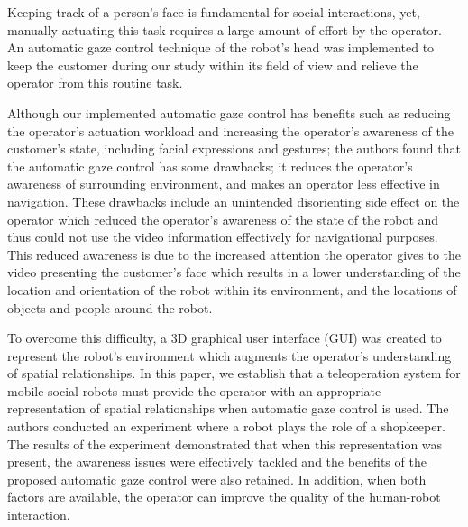 \documentclass[a4paper, 10pt, conference]{ieeeconf}     %
\begin{document}
Keeping track of a person's face is fundamental for social interactions, yet, manually actuating this task requires a large amount of effort by the operator.
An automatic gaze control technique of the robot's head was implemented to keep the customer during our study within its field of view and relieve the operator from this routine task.

Although our implemented automatic gaze control has benefits such as reducing the operator's actuation workload and increasing the operator's awareness of the customer's state, including facial expressions and gestures; the authors found that the automatic gaze control has some drawbacks; it reduces the operator's awareness of surrounding environment, and makes an operator less effective in navigation.
These drawbacks include an unintended disorienting side effect on the operator which reduced the operator's awareness of the state of the robot and thus could not use the video information effectively for navigational purposes.
This reduced awareness is due to the increased attention the operator gives to the video presenting the customer's face which results in a lower understanding of the location and orientation of the robot within its environment, and the locations of objects and people around the robot.

To overcome this difficulty, a 3D graphical user interface (GUI) was created to represent the robot's environment which augments the operator's understanding of spatial relationships.
In this paper, we establish that a teleoperation system for mobile social robots must provide the operator with an appropriate representation of spatial relationships when automatic gaze control is used.
The authors conducted an experiment where a robot plays the role of a shopkeeper. 
The results of the experiment demonstrated that when this representation was present, the awareness issues were effectively tackled and the benefits of the proposed automatic gaze control were also retained.
In addition, when both factors are available, the operator can improve the quality of the human-robot interaction.
\end{document}
